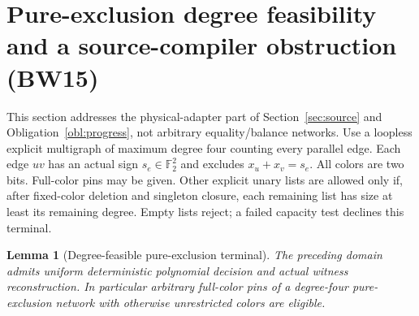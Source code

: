 \documentclass[11pt]{article}
\newtheorem{lemma}[theorem]{Lemma}
\begin{document}
\section{Pure-exclusion degree feasibility and a source-compiler obstruction (BW15)}\label{sec:bw15}
This section addresses the physical-adapter part of Section~\ref{sec:source} and Obligation~\ref{obl:progress}, not arbitrary equality/balance networks. Use a loopless explicit multigraph of maximum degree four counting every parallel edge. Each edge $uv$ has an actual sign $s_e\in\mathbb F_2^2$ and excludes $x_u+x_v=s_e$. All colors are two bits. Full-color pins may be given. Other explicit unary lists are allowed only if, after fixed-color deletion and singleton closure, each remaining list has size at least its remaining degree. Empty lists reject; a failed capacity test declines this terminal.
\begin{lemma}[Degree-feasible pure-exclusion terminal]\label{lem:bw15-dp}
The preceding domain admits uniform deterministic polynomial decision and actual witness reconstruction. In particular arbitrary full-color pins of a degree-four pure-exclusion network with otherwise unrestricted colors are eligible.
\end{lemma}
\end{document}
